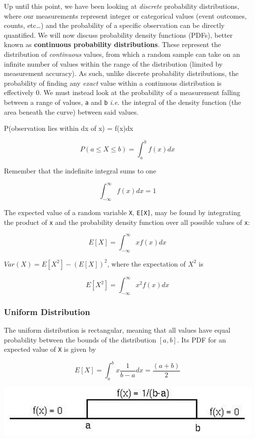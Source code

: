 \documentclass[]{book}
\begin{document}
Up until this point, we have been looking at \emph{discrete} probability distributions, where our measurements represent integer or categorical values (event outcomes, counts, etc\ldots{}) and the probability of a specific observation can be directly quantified. We will now discuss probability density functions (PDFs), better known as \textbf{continuous probability distributions}. These represent the distribution of \emph{continuous} values, from which a random sample can take on an infinite number of values within the range of the distribution (limited by measurement accuracy). As such, unlike discrete probability distributions, the probability of finding any \emph{exact} value within a continuous distribution is effectively 0. We must instead look at the probability of a measurement falling between a range of values, \texttt{a} and \texttt{b} \emph{i.e.} the integral of the density function (the area beneath the curve) between said values.

P(observation lies within dx of x) = f(x)dx

\[P(a\leq X \leq b) = \int_{a}^{b} f(x) dx\]

Remember that the indefinite integral sums to one

\[\int_{-\infty}^{\infty} f(x) dx = 1\]

The expected value of a random variable \texttt{X}, \texttt{E{[}X{]}}, may be found by integrating the product of \texttt{x} and the probability density function over all possible values of \texttt{x}:

\[E[X] = \int_{-\infty}^{\infty} xf(x) dx \]

\(Var(X) = E[X^2] - (E[X])^2\), where the expectation of \(X^2\) is

\[E[X^2] = \int_{-\infty}^{\infty} x^2f(x) dx \]

\hypertarget{uniform-distribution}{%
\subsubsection{\texorpdfstring{\textbf{Uniform Distribution}}{Uniform Distribution}}\label{uniform-distribution}}

The uniform distribution is rectangular, meaning that all values have equal probability between the bounds of the distribution \([a,b]\). Its PDF for an expected value of \texttt{X} is given by

\[E[X] = \int_{a}^{b} x\frac{1}{b-a} dx = \frac{(a+b)}{2} \]

\begin{center}\includegraphics[width=1\linewidth]{images/prob.019} \end{center}
\end{document}
